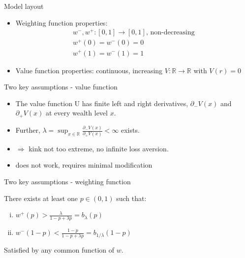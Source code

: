 \begin{frame}{Model layout}
    \begin{itemize}
    \item Weighting function properties:
    \begin{align*}
        w^-,w^+:[0,1] \rightarrow [0,1],\, \text{non-decreasing}\\
        w^+(0) = w^-(0) = 0\\
        w^+(1) = w^-(1) = 1
    \end{align*}
    \item Value function properties: continuous, increasing $V:\mathbb{R} \rightarrow \mathbb{R}$ with $V(r) = 0$\medskip
\end{itemize}
\end{frame}

\begin{frame}{Two key assumptions - value function}
    \begin{assumption}[1]
    \begin{itemize}
        \item The value function U has finite left and right derivatives,
       $\partial _-V(x)$ and $\partial _+V(x)$ at every wealth level $x$.\medskip
        \item Further, $\lambda = \sup _{x\in \mathbb{R} } \frac{\partial _-V(x)}{\partial _+V(x)} < \infty$ exists.\medskip
        \item $\Rightarrow$ kink not too extreme, no infinite loss aversion.\medskip
        \item \citep{KahnemanTversky1979} does not work, requires minimal modification\medskip
    \end{itemize}
\end{assumption}
\end{frame}

\begin{frame}{Two key assumptions - weighting function}
\begin{assumption}[2]
    There exists at least one $p \in (0,1)$ such that:\medskip
    \begin{enumerate}[(i)]
        \item $w^+(p)> \frac{\lambda}{1-p+\lambda p} = b_{\lambda}(p)$ \medskip
        \item $w^-(1-p)< \frac{1-p}{1-p+\lambda p} = b_{1/\lambda}(1-p)$  \medskip
	\end{enumerate}
    Satisfied by any common function of $w$.
\end{assumption}
\end{frame}


